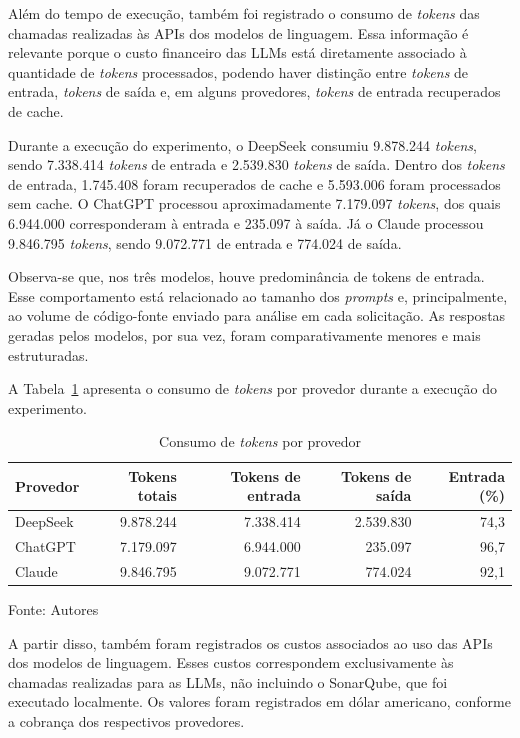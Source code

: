 Além do tempo de execução, também foi registrado o consumo de \textit{tokens} das chamadas realizadas às APIs dos modelos de linguagem. 
Essa informação é relevante porque o custo financeiro das LLMs está diretamente associado à quantidade de \textit{tokens} processados, podendo haver distinção entre \textit{tokens} de entrada, \textit{tokens} de saída e, em alguns provedores, \textit{tokens} de entrada recuperados de cache.

Durante a execução do experimento, o DeepSeek consumiu 9.878.244 \textit{tokens}, sendo 7.338.414 \textit{tokens} de entrada e 2.539.830 \textit{tokens} de saída. 
Dentro dos \textit{tokens} de entrada, 1.745.408 foram recuperados de cache e 5.593.006 foram processados sem cache. 
O ChatGPT processou aproximadamente 7.179.097 \textit{tokens}, dos quais 6.944.000 corresponderam à entrada e 235.097 à saída. 
Já o Claude processou 9.846.795 \textit{tokens}, sendo 9.072.771 de entrada e 774.024 de saída.

Observa-se que, nos três modelos, houve predominância de tokens de entrada. 
Esse comportamento está relacionado ao tamanho dos \textit{prompts} e, principalmente, ao volume de código-fonte enviado para análise em cada solicitação. 
As respostas geradas pelos modelos, por sua vez, foram comparativamente menores e mais estruturadas.

A Tabela~\ref{tab:tokens-llms} apresenta o consumo de \textit{tokens} por provedor durante a execução do experimento.

\begin{table}[H]
\centering
\caption{Consumo de \textit{tokens} por provedor}
\label{tab:tokens-llms}
\begin{tabular}{lrrrr}
\hline
Provedor & Tokens totais & Tokens de entrada & Tokens de saída & Entrada (\%) \\
\hline
DeepSeek & 9.878.244 & 7.338.414 & 2.539.830 & 74,3 \\
ChatGPT & 7.179.097 & 6.944.000 & 235.097 & 96,7 \\
Claude & 9.846.795 & 9.072.771 & 774.024 & 92,1 \\
\hline
\end{tabular}

Fonte: Autores
\end{table}

A partir disso, também foram registrados os custos associados ao uso das APIs dos modelos de linguagem. 
Esses custos correspondem exclusivamente às chamadas realizadas para as LLMs, não incluindo o SonarQube, que foi executado localmente. 
Os valores foram registrados em dólar americano, conforme a cobrança dos respectivos provedores.

